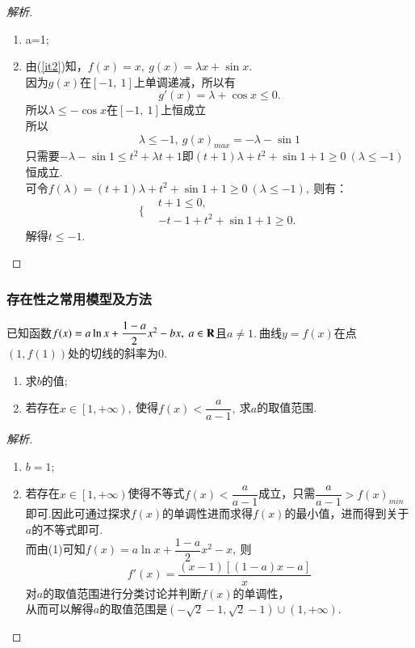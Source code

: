 \begin{proof}[解析]
\begin{enumerate}[(1)]
\item \label{it2}a=1;
\item 由(\ref{it2})知，$ f(x)=x,~g(x)=\lambda x+\sin x $.\\因为$ g(x) $在$ \left[-1,~1\right] $上单调递减，所以有\[ g'(x)=\lambda +\cos x\le 0. \]
所以$ \lambda \le -\cos x $在$ \left[-1,~1\right] $上恒成立\\
所以$$ \lambda \le -1,~g(x)_{max} =-\lambda-\sin 1$$只需要$ -\lambda -\sin 1\le t^2+\lambda t+1 $即$ (t+1)\lambda +t^2+\sin 1 +1\ge 0~(\lambda\le -1) $恒成立.\\
可令$ f(\lambda)=(t+1)\lambda +t^2+\sin 1+1\ge 0~(\lambda \le -1) ,~$则有：\[ \Bigg\{\begin{aligned}
&t+1\le 0,\\
&-t-1+t^2+\sin 1+1\ge 0.
\end{aligned}\]解得$ t\le -1. $
\end{enumerate}
\end{proof}
\subsubsection{存在性之常用模型及方法}
\begin{example}
已知函数$f(x)=a\ln x+\dfrac{1-a}{2}x^2-bx,~a\in\mathbf{R}$且$ a\ne 1 .~$曲线$ y=f(x) $在点$\left(1,f(1)\right)  $处的切线的斜率为$0$.
\end{example}
\begin{enumerate}[(1)]
\item 求$b$的值;
\item 若存在$ x\in \left[1,+\infty\right),~ $使得$ f(x)<\dfrac{a}{a-1} ,~$求$ a $的取值范围.
\end{enumerate}
\begin{proof}[解析]
\begin{enumerate}[(1)]
\item $ b =1$;
\item 若存在$ x\in \left[1,+\infty\right) $使得不等式$ f(x)<\dfrac{a}{a-1} $成立，只需$ \dfrac{a}{a-1}>f(x)_{min} $即可.因此可通过探求$ f(x) $的单调性进而求得$f(x)$的最小值，进而得到关于$ a $的不等式即可.\\
而由(1)可知$ f(x)=a\ln x+\dfrac{1-a}{2}x^2-x ,~$则\[f'(x)=\dfrac{(x-1)\left[(1-a)x-a\right]}{x}\]对$ a $的取值范围进行分类讨论并判断$f(x)$的单调性，\\从而可以解得$ a $的取值范围是$ \left(-\sqrt{2}-1,\sqrt{2}-1\right)\cup(1,+\infty). $
\end{enumerate}
\end{proof}
\newpage
